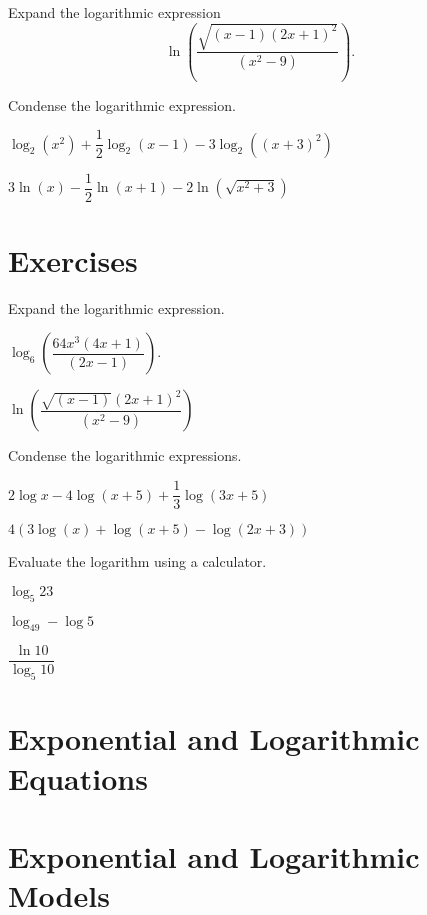 \vspace*{-0.2\textheight}

\begin{example}
  Expand the logarithmic expression
  \[\ln \left (\dfrac{\sqrt{(x-1){(2x+1)}^2}}{(x^2-9)}\right ).\]
\end{example}

\begin{example}
  Condense the logarithmic expression.\\
  \begin{enumerate*}
    \item $\log_2(x^2)+\dfrac{1}{2}\log_2(x-1)-3\log_2({(x+3)}^2)$
    \item $3\ln(x)-\dfrac{1}{2}\ln(x+1)-2\ln(\sqrt{x^2+3})$ \hfill\null
  \end{enumerate*}
\end{example}

\newpage

\section*{Exercises}

\begin{exercise}
  \begin{example}
    Expand the logarithmic expression.\\
    \begin{enumerate*}
     \item $\log_6\left(\dfrac{64x^3(4x+1)}{(2x-1)} \right)$.
     \item $\ln\left(\dfrac{\sqrt{(x-1)}(2x+1)^2}{(x^2-9)}\right)$
     \hfill\null
    \end{enumerate*}
   \end{example}
\end{exercise}

\begin{exercise}
  Condense the logarithmic expressions.\\
  \begin{enumerate*}
    \item $2\log x-4\log(x+5)+\dfrac{1}{3}\log(3x+5)$
    \item $4(3\log(x)+\log(x+5)-\log(2x+3))$
  \end{enumerate*}
\end{exercise}

\begin{exercise}
  Evaluate the logarithm using a calculator.\\
  \begin{enumerate*}
    \item $\log_5{23}$
    \item $\log_49-\log5$
    \item $\dfrac{\ln10}{\log_5{10}}$\hfill\null
  \end{enumerate*}
\end{exercise}

\newpage
\section{Exponential and Logarithmic Equations}

\newpage
\section{Exponential and Logarithmic Models}









